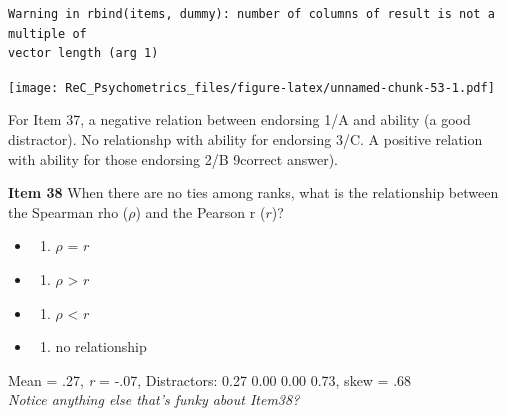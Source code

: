 \documentclass[
  english,
]{book}
\newenvironment{Shaded}{\begin{snugshade}}{\end{snugshade}}
\newcommand{\AttributeTok}[1]{\textcolor[rgb]{0.77,0.63,0.00}{#1}}
\newcommand{\DecValTok}[1]{\textcolor[rgb]{0.00,0.00,0.81}{#1}}
\newcommand{\FunctionTok}[1]{\textcolor[rgb]{0.00,0.00,0.00}{#1}}
\newcommand{\NormalTok}[1]{#1}
\newcommand{\SpecialCharTok}[1]{\textcolor[rgb]{0.00,0.00,0.00}{#1}}
\providecommand{\tightlist}{%
  \setlength{\itemsep}{0pt}\setlength{\parskip}{0pt}}
\begin{document}
\begin{verbatim}
Warning in rbind(items, dummy): number of columns of result is not a multiple of
vector length (arg 1)
\end{verbatim}

\texttt{[image: ReC\_Psychometrics\_files/figure-latex/unnamed-chunk-53-1.pdf]}

For Item 37, a negative relation between endorsing 1/A and ability (a good distractor). No relationshp with ability for endorsing 3/C. A positive relation with ability for those endorsing 2/B 9correct answer).

\textbf{Item 38} When there are no ties among ranks, what is the relationship between the Spearman rho (\(\rho\)) and the Pearson r (\(r\))?

\begin{itemize}
\item
  \begin{enumerate}
  \def\labelenumi{\alph{enumi})}
  \tightlist
  \item
    \(\rho\) = \(r\)
  \end{enumerate}
\item
  \begin{enumerate}
  \def\labelenumi{\roman{enumi})}
  \setcounter{enumi}{1}
  \tightlist
  \item
    \(\rho\) \textgreater{} \(r\)
  \end{enumerate}
\item
  \begin{enumerate}
  \def\labelenumi{\alph{enumi})}
  \tightlist
  \item
    \(\rho\) \textless{} \(r\)
  \end{enumerate}
\item
  \begin{enumerate}
  \def\labelenumi{\alph{enumi})}
  \setcounter{enumi}{1}
  \tightlist
  \item
    no relationship
  \end{enumerate}
\end{itemize}

Mean = .27, \emph{r} = -.07, Distractors: 0.27 0.00 0.00 0.73, skew = .68\\
\emph{Notice anything else that's funky about Item38?}

\begin{Shaded}
\end{Shaded}
\end{document}
